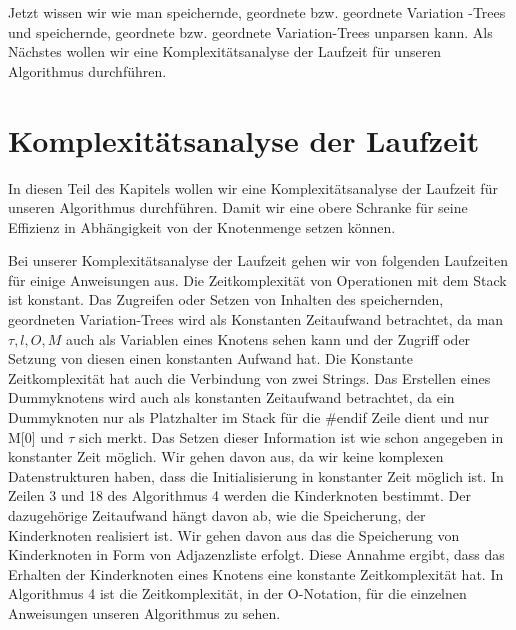 Jetzt wissen wir wie man speichernde, geordnete bzw. geordnete Variation -Trees und speichernde, geordnete bzw. geordnete Variation-Trees unparsen kann. Als Nächstes wollen wir eine Komplexitätsanalyse der Laufzeit für unseren Algorithmus durchführen.

\section{Komplexitätsanalyse der Laufzeit}

In diesen Teil des Kapitels wollen wir eine Komplexitätsanalyse der Laufzeit für unseren Algorithmus durchführen. Damit wir eine obere Schranke für seine Effizienz in Abhängigkeit von der Knotenmenge setzen können.

Bei unserer Komplexitätsanalyse der Laufzeit gehen wir von folgenden Laufzeiten für einige Anweisungen aus. Die Zeitkomplexität von Operationen mit dem Stack ist konstant. Das Zugreifen oder Setzen von Inhalten des speichernden, geordneten Variation-Trees wird als Konstanten Zeitaufwand betrachtet, da man $\tau, l, O, M$ auch als Variablen eines Knotens sehen kann und der Zugriff oder Setzung von diesen einen konstanten Aufwand hat. Die Konstante Zeitkomplexität hat auch die Verbindung von zwei Strings. Das Erstellen eines Dummyknotens wird auch als konstanten Zeitaufwand betrachtet, da ein Dummyknoten nur als Platzhalter im Stack für die \#endif Zeile dient und nur M[0] und $\tau$ sich merkt. Das Setzen dieser Information ist wie schon angegeben in konstanter Zeit möglich. Wir gehen davon aus, da wir keine komplexen Datenstrukturen haben, dass die Initialisierung in konstanter Zeit möglich ist. In Zeilen 3  und 18 des Algorithmus 4 werden die Kinderknoten bestimmt. Der dazugehörige Zeitaufwand hängt davon ab, wie die Speicherung, der Kinderknoten realisiert ist. Wir gehen davon aus das die Speicherung von Kinderknoten in Form von Adjazenzliste erfolgt. Diese Annahme ergibt, dass das Erhalten der Kinderknoten eines Knotens eine konstante Zeitkomplexität hat. In Algorithmus 4 ist die Zeitkomplexität, in der O-Notation, für die einzelnen  Anweisungen unseren Algorithmus zu sehen.


